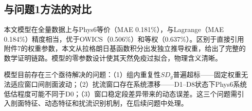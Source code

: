 \subsection{与问题1方法的对比}

本文模型在全量数据上与Phys6等价（MAE 0.181\%），与Lagrange（MAE 0.184\%）精度相当，优于OWICS（0.506\%）和等权（0.637\%）。区别于直接引用附件7的权重参数，本文从拉格朗日基函数积分出发独立推导权重，给出了完整的数学证明链路。模型的零参数设计使其天然免疫过拟合，物理含义清晰。

模型目前存在三个亟待解决的问题：（1）组内重复性$SD_g$普遍超标——固定权重无法适应窗口间剖面波动；（2）扰流窗口存在系统漂移——D1--D8状态下Phys6系统低估程度可能不同于D0；（3）窗口稳定段差异带来的动态误差。这三个问题需引入剖面特征、动态特征和扰流识别机制，在后续问题中处理。
